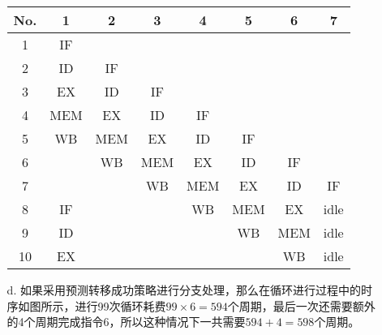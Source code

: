 \documentclass[UTF8,zihao=-4]{ctexart}
\begin{document}
\begin{enumerate}
\begin{enumerate}
			\begin{center}
				\begin{tabular}{|c|c|c|c|c|c|c|c|}
					\hline
					No. &  1  &  2  &  3  &  4  &  5  &  6  &  7   \\ \hline
					 1  & IF  &     &     &     &     &     &      \\
					 2  & ID  & IF  &     &     &     &     &      \\
					 3  & EX  & ID  & IF  &     &     &     &      \\
					 4  & MEM & EX  & ID  & IF  &     &     &      \\
					 5  & WB  & MEM & EX  & ID  & IF  &     &      \\
					 6  &     & WB  & MEM & EX  & ID  & IF  &      \\
					 7  &     &     & WB  & MEM & EX  & ID  &  IF  \\ \hline
					 8  & IF  &     &     & WB  & MEM & EX  & idle \\
					 9  & ID  &     &     &     & WB  & MEM & idle \\
					10  & EX  &     &     &     &     & WB  & idle \\ \hline
				\end{tabular}
			\end{center}
			\pagebreak
			\item[d.]如果采用预测转移成功策略进行分支处理，那么在循环进行过程中的时序如图所示，进行99次循环耗费$99\times 6=594$个周期，最后一次还需要额外的4个周期完成指令6，所以这种情况下一共需要$594+4=598$个周期。


\end{enumerate}
\end{enumerate}
\end{document}
